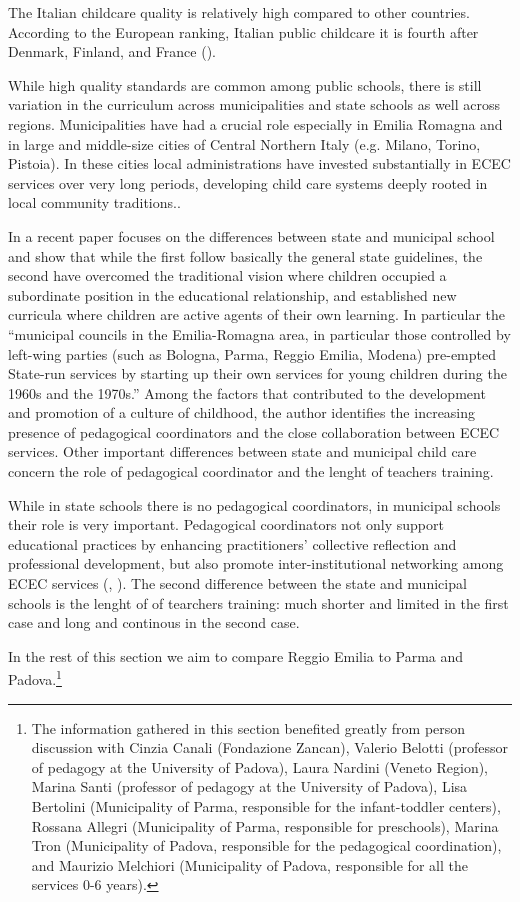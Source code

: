 \documentclass[12pt]{article}
\begin{document}
The Italian childcare quality is relatively high compared to other countries. According to the European ranking, Italian public childcare it is fourth after Denmark, Finland, and France (\cite{DeHenau2008}).

While high quality standards are common among public schools, there is still variation in the curriculum across municipalities and state schools as well across regions. Municipalities have had a crucial role especially in Emilia Romagna and in large and middle-size cities of Central Northern Italy (e.g. Milano, Torino, Pistoia). In these cities local administrations have invested substantially in ECEC services over very long periods, developing child care systems deeply rooted in local community traditions..

In a recent paper \cite{Lazzari2012a} focuses on the differences between state and municipal school and show that while the first follow basically the general state guidelines, the second have overcomed the traditional vision where children occupied a subordinate position in the educational relationship, and established new curricula where children are active agents of their own learning. In particular the ``municipal councils in the Emilia-Romagna area, in particular those controlled by left-wing parties (such as Bologna, Parma, Reggio Emilia, Modena) pre-empted State-run services by starting up their own services for young children during the 1960s and the 1970s.'' Among the factors that contributed to the development and promotion of a culture of childhood, the author identifies the increasing presence of pedagogical coordinators and the close collaboration between ECEC services. Other important differences between state and municipal child care concern the role of pedagogical coordinator and the lenght of teachers training.

While in state schools there is no pedagogical coordinators, in municipal schools their role is very important. Pedagogical coordinators not only support educational practices by enhancing practitioners' collective reflection and professional development, but also promote inter-institutional networking among ECEC services (\cite{Benedetti2009}, \cite{Musatti2012}). The second difference between the state and municipal schools is the lenght of of tearchers training: much shorter and limited in the first case and long and continous in the second case.

In the rest of this section we aim to compare Reggio Emilia to Parma and Padova.\footnote{The information gathered in this section benefited greatly from person discussion with Cinzia Canali (Fondazione Zancan), Valerio Belotti (professor of pedagogy at the University of Padova), Laura Nardini (Veneto Region), Marina Santi (professor of pedagogy at the University of Padova), Lisa Bertolini (Municipality of Parma, responsible for the infant-toddler centers), Rossana Allegri (Municipality of Parma, responsible for preschools), Marina Tron (Municipality of Padova, responsible for the pedagogical coordination), and Maurizio Melchiori (Municipality of Padova, responsible for all the services 0-6 years).} 
\end{document}
